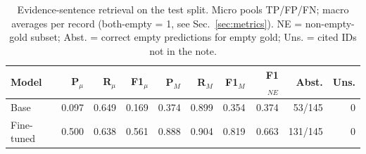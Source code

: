 \begin{table}[t]
\centering
\footnotesize
\caption{Evidence-sentence retrieval on the test split. Micro pools TP/FP/FN; macro averages per record (both-empty = 1, see Sec.~\ref{sec:metrics}). NE = non-empty-gold subset; Abst. = correct empty predictions for empty gold; Uns. = cited IDs not in the note.}
\label{tab:evidence}
\begin{tabular}{lrrrrrrrrr}
\toprule
Model & P$_\mu$ & R$_\mu$ & F1$_\mu$ & P$_M$ & R$_M$ & F1$_M$ & F1$_{NE}$ & Abst. & Uns. \\
\midrule
Base & 0.097 & 0.649 & 0.169 & 0.374 & 0.899 & 0.354 & 0.374 & 53/145 & 0 \\
Fine-tuned & 0.500 & 0.638 & 0.561 & 0.888 & 0.904 & 0.819 & 0.663 & 131/145 & 0 \\
\bottomrule
\end{tabular}
\end{table}
